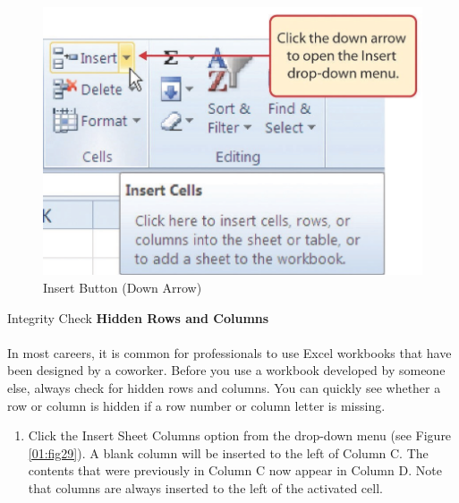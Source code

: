 \begin{figure}[H]
	\centering
	\includegraphics[width=\maxwidth{.95\linewidth}]{gfx/ch01_fig28}
	\caption{Insert Button (Down Arrow)}
	\label{01:fig28}
\end{figure}

\begin{center}
	\begin{infobox}{Integrity Check}
		\textbf{Hidden Rows and Columns}
		\\
		\\
		In most careers, it is common for professionals to use Excel workbooks that have been designed by a coworker. Before you use a workbook developed by someone else, always check for hidden rows and columns. You can quickly see whether a row or column is hidden if a row number or column letter is missing.
	\end{infobox}
\end{center}

\begin{enumerate}[resume]
	\item Click the Insert Sheet Columns option from the drop-down menu (see Figure \ref{01:fig29}). A blank column will be inserted to the left of Column \textsf{C}. The contents that were previously in Column \textsf{C} now appear in Column \textsf{D}. Note that columns are always inserted to the left of the activated cell.

\end{enumerate}

